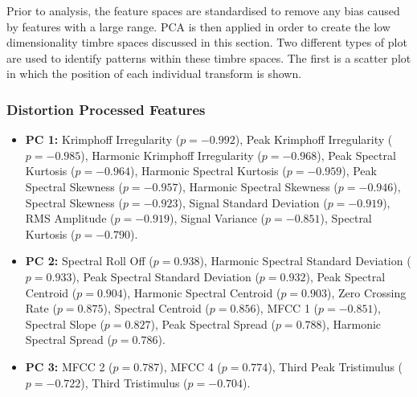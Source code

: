 		Prior to analysis, the feature spaces are standardised to remove any bias caused by features with a large
		range. PCA is then applied in order to create the low dimensionality timbre spaces discussed in this
		section. Two different types of plot are used to identify patterns within these timbre spaces. The first is
		a scatter plot in which the position of each individual transform is shown.

		\subsubsection*{Distortion Processed Features}
			\begin{itemize}
				\item {\bf{PC 1:}} Krimphoff Irregularity ($p = -0.992$), Peak Krimphoff Irregularity ($p =
					-0.985$), Harmonic Krimphoff Irregularity ($p = -0.968$), Peak Spectral Kurtosis ($p
					= -0.964$), Harmonic Spectral Kurtosis ($p = -0.959$), Peak Spectral Skewness ($p =
					-0.957$), Harmonic Spectral Skewness ($p = -0.946$), Spectral Skewness ($p =
					-0.923$), Signal Standard Deviation ($p = -0.919$), RMS Amplitude ($p = -0.919$),
					Signal Variance ($p = -0.851$), Spectral Kurtosis ($p = -0.790$).
				\item {\bf{PC 2:}} Spectral Roll Off ($p =  0.938$), Harmonic Spectral Standard Deviation
					($p =  0.933$), Peak Spectral Standard Deviation ($p =  0.932$), Peak Spectral
					Centroid ($p =  0.904$), Harmonic Spectral Centroid ($p =  0.903$), Zero Crossing
					Rate ($p =  0.875$), Spectral Centroid ($p =  0.856$), MFCC 1 ($p = -0.851$),
					Spectral Slope ($p =  0.827$), Peak Spectral Spread ($p =  0.788$), Harmonic
					Spectral Spread ($p =  0.786$).
				\item {\bf{PC 3:}} MFCC 2 ($p =  0.787$), MFCC 4 ($p =  0.774$), Third Peak Tristimulus ($p
					= -0.722$), Third Tristimulus ($p = -0.704$).
			\end{itemize}

